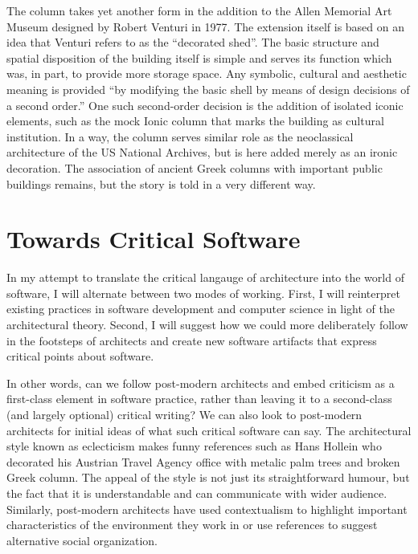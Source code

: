 The column takes yet another form in the addition to the Allen Memorial Art Museum designed by
Robert Venturi in 1977. The extension itself is based on an idea that Venturi refers to as
the ``decorated shed''. The basic structure and spatial disposition of the building itself is
simple and serves its function which was, in part, to provide more storage space.
Any symbolic, cultural and aesthetic meaning is provided ``by modifying the basic shell by means
of design decisions of a second order.'' One such second-order
decision is the addition of isolated iconic elements, such as the mock Ionic column that
marks the building as cultural institution. In a way, the column serves similar role as the
neoclassical architecture of the US National Archives, but is here added merely as an ironic
decoration. The association of ancient Greek columns with important public buildings remains,
but the story is told in a very different way.

%
%
%
%

\section{Towards Critical Software}

In my attempt to translate the critical langauge of architecture into the world of software,
I will alternate between two modes of working. First, I will reinterpret existing practices
in software development and computer science in light of the architectural theory. Second,
I will suggest how we could more deliberately follow in the footsteps of architects and
create new software artifacts that express critical points about software.

In other words, can we follow post-modern architects and embed criticism as a first-class
element in software practice, rather than leaving it to a second-class (and largely optional)
critical writing? We can also look to
post-modern architects for initial ideas of what such critical software can say. The
architectural style known as eclecticism makes funny references such as Hans Hollein who
decorated his Austrian Travel Agency office with metalic palm trees and broken Greek
column. The appeal of the style is not just its straightforward humour,
but the fact that it is understandable and can communicate with wider audience. Similarly,
post-modern architects have used contextualism to highlight important characteristics of the
environment they work in or use references to suggest alternative social organization.

